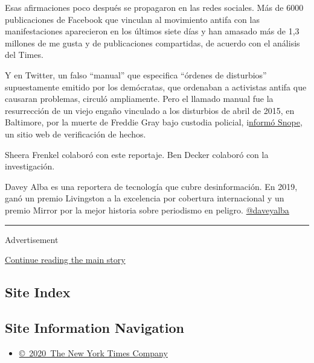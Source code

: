 Esas afirmaciones poco después se propagaron en las redes sociales. Más
de 6000 publicaciones de Facebook que vinculan al movimiento antifa con
las manifestaciones aparecieron en los últimos siete días y han amasado
más de 1,3 millones de me gusta y de publicaciones compartidas, de
acuerdo con el análisis del Times.

Y en Twitter, un falso ``manual'' que especifica ``órdenes de
disturbios'' supuestamente emitido por los demócratas, que ordenaban a
activistas antifa que causaran problemas, circuló ampliamente. Pero el
llamado manual fue la resurrección de un viejo engaño vinculado a los
disturbios de abril de 2015, en Baltimore, por la muerte de Freddie Gray
bajo custodia policial,
i\href{https://www.snopes.com/fact-check/floyd-instruction-manual-protesters/}{nformó
Snope}, un sitio web de verificación de hechos.

Sheera Frenkel colaboró con este reportaje. Ben Decker colaboró con la
investigación.

Davey Alba es una reportera de tecnología que cubre desinformación. En
2019, ganó un premio Livingston a la excelencia por cobertura
internacional y un premio Mirror por la mejor historia sobre periodismo
en peligro. \href{https://twitter.com/daveyalba}{@daveyalba}

\begin{center}\rule{0.5\linewidth}{\linethickness}\end{center}

Advertisement

\protect\hyperlink{after-bottom}{Continue reading the main story}

\hypertarget{site-index}{%
\subsection{Site Index}\label{site-index}}

\hypertarget{site-information-navigation}{%
\subsection{Site Information
Navigation}\label{site-information-navigation}}

\begin{itemize}
\tightlist
\item
  \href{https://help.nytimes.com/hc/en-us/articles/115014792127-Copyright-notice}{©~2020~The
  New York Times Company}
\end{itemize}

